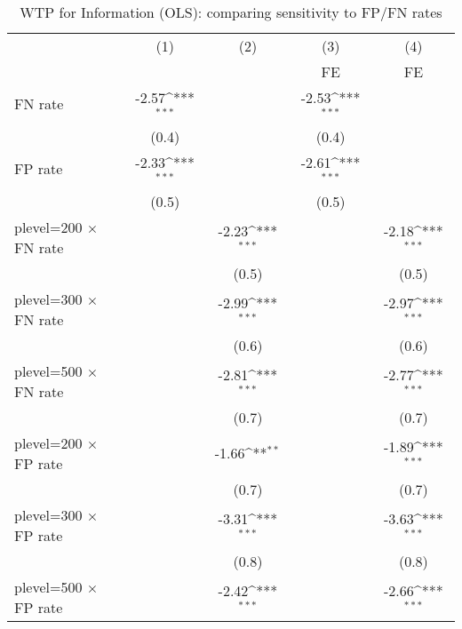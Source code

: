 \begin{table}[htbp]\centering
\def\sym#1{\ifmmode^{#1}\else\(^{#1}\)\fi}
\caption{WTP for Information (OLS): comparing sensitivity to FP/FN rates}
\begin{tabular}{l*{4}{c}}
\hline\hline
                &\multicolumn{1}{c}{(1)}&\multicolumn{1}{c}{(2)}&\multicolumn{1}{c}{(3)}&\multicolumn{1}{c}{(4)}\\
                &\multicolumn{1}{c}{}&\multicolumn{1}{c}{}&\multicolumn{1}{c}{FE}&\multicolumn{1}{c}{FE}\\
\hline
FN rate         &    -2.57\sym{***}&                  &    -2.53\sym{***}&                  \\
                &    (0.4)         &                  &    (0.4)         &                  \\
FP rate         &    -2.33\sym{***}&                  &    -2.61\sym{***}&                  \\
                &    (0.5)         &                  &    (0.5)         &                  \\
plevel=200 $\times$ FN rate&                  &    -2.23\sym{***}&                  &    -2.18\sym{***}\\
                &                  &    (0.5)         &                  &    (0.5)         \\
plevel=300 $\times$ FN rate&                  &    -2.99\sym{***}&                  &    -2.97\sym{***}\\
                &                  &    (0.6)         &                  &    (0.6)         \\
plevel=500 $\times$ FN rate&                  &    -2.81\sym{***}&                  &    -2.77\sym{***}\\
                &                  &    (0.7)         &                  &    (0.7)         \\
plevel=200 $\times$ FP rate&                  &    -1.66\sym{**} &                  &    -1.89\sym{***}\\
                &                  &    (0.7)         &                  &    (0.7)         \\
plevel=300 $\times$ FP rate&                  &    -3.31\sym{***}&                  &    -3.63\sym{***}\\
                &                  &    (0.8)         &                  &    (0.8)         \\
plevel=500 $\times$ FP rate&                  &    -2.42\sym{***}&                  &    -2.66\sym{***}\\

\end{tabular}
\end{table}
